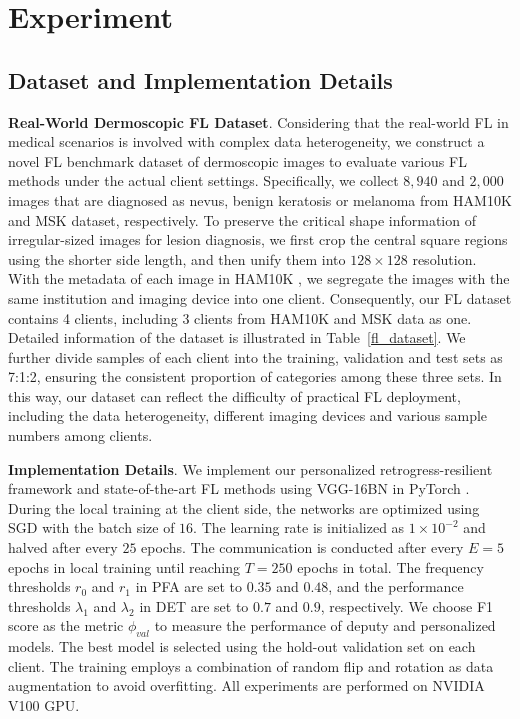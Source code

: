\documentclass[runningheads]{llncs}
\begin{document}
\section{Experiment}
\subsection{Dataset and Implementation Details}
\textbf{Real-World Dermoscopic FL Dataset}.
Considering that the real-world FL in medical scenarios is involved with complex data heterogeneity, we construct a novel FL benchmark dataset of dermoscopic images to evaluate various FL methods under the actual client settings. Specifically, we collect $8,940$ and $2,000$ images that are diagnosed as nevus, benign keratosis or melanoma from HAM10K \cite{ham10k} and MSK \cite{msk} dataset, respectively. To preserve the critical shape information of irregular-sized images for lesion diagnosis, we first crop the central square regions using the shorter side length, and then unify them into $128\times 128$ resolution. With the metadata of each image in HAM10K \cite{ham10k}, we segregate the images with the same institution and imaging device into one client. Consequently, our FL dataset contains 4 clients, including 3 clients from HAM10K \cite{ham10k} and MSK \cite{msk} data as one. Detailed information of the dataset is illustrated in Table~\ref{fl_dataset}. We further divide samples of each client into the training, validation and test sets as 7:1:2, ensuring the consistent proportion of categories among these three sets. In this way, our dataset can reflect the difficulty of practical FL deployment, including the data heterogeneity, different imaging devices and various sample numbers among clients.



\noindent \textbf{Implementation Details}.
We implement our personalized retrogress-resilient framework and state-of-the-art FL methods using VGG-16BN \cite{vgg} in PyTorch \cite{pytorch}. During the local training at the client side, the networks are optimized using SGD with the batch size of $16$. The learning rate is initialized as $1\times 10^{-2}$ and halved after every $25$ epochs. The communication is conducted after every $E=5$ epochs in local training until reaching $T=250$ epochs in total. The frequency thresholds $r_{0}$ and $r_{1}$ in PFA are set to $0.35$ and $0.48$, and the performance thresholds $\lambda_1$ and $\lambda_2$ in DET are set to $0.7$ and $0.9$, respectively. We choose F1 score as the metric $\phi_{val}$ to measure the performance of deputy and personalized models. The best model is selected using the hold-out validation set on each client. The training employs a combination of random flip and rotation as data augmentation to avoid overfitting. All experiments are performed on NVIDIA V100 GPU. 
\end{document}
